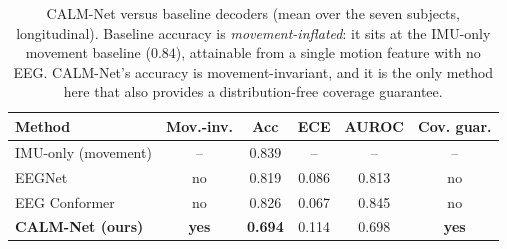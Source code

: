 \documentclass[journal]{IEEEtran}
\begin{document}
\begin{table}[t]
\caption{CALM-Net versus baseline decoders (mean over the seven subjects,
longitudinal). Baseline accuracy is \emph{movement-inflated}: it sits at the IMU-only
movement baseline ($0.84$), attainable from a single motion feature with no EEG.
CALM-Net's accuracy is movement-invariant, and it is the only method here that also
provides a distribution-free coverage guarantee.}
\label{tab:cmp}
\centering
\begin{tabular}{lccccc}
\toprule
Method & Mov.-inv. & Acc & ECE & AUROC & Cov. guar. \\
\midrule
IMU-only (movement) & -- & 0.839 & -- & -- & -- \\
EEGNet~\cite{lawhern2018} & no & 0.819 & 0.086 & 0.813 & no \\
EEG Conformer~\cite{song2023} & no & 0.826 & 0.067 & 0.845 & no \\
\textbf{CALM-Net (ours)} & \textbf{yes} & \textbf{0.694} & 0.114 & 0.698 & \textbf{yes} \\
\bottomrule
\end{tabular}
\end{table}
\end{document}
